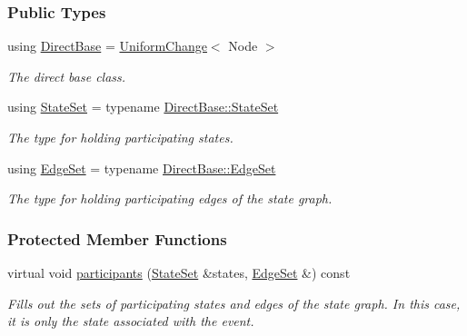 \subsubsection*{Public Types}
\begin{DoxyCompactItemize}
\item 
using \hyperlink{structevent_1_1VertexChange_aa6545b42a28177a72cfb6010582a9e55}{Direct\+Base} = \hyperlink{structevent_1_1UniformChange}{Uniform\+Change}$<$ Node $>$\hypertarget{structevent_1_1VertexChange_aa6545b42a28177a72cfb6010582a9e55}{}\label{structevent_1_1VertexChange_aa6545b42a28177a72cfb6010582a9e55}

\begin{DoxyCompactList}\small\item\em The direct base class. \end{DoxyCompactList}\item 
using \hyperlink{structevent_1_1VertexChange_abc767a10b12e5126c7be6c1ffa4ebc6c}{State\+Set} = typename \hyperlink{structevent_1_1UniformChange_a71997f4cc920d6c5c65fab2049d5e42d}{Direct\+Base\+::\+State\+Set}\hypertarget{structevent_1_1VertexChange_abc767a10b12e5126c7be6c1ffa4ebc6c}{}\label{structevent_1_1VertexChange_abc767a10b12e5126c7be6c1ffa4ebc6c}

\begin{DoxyCompactList}\small\item\em The type for holding participating states. \end{DoxyCompactList}\item 
using \hyperlink{structevent_1_1VertexChange_a85d3d16cf43461137d3d646e99f31be2}{Edge\+Set} = typename \hyperlink{structevent_1_1UniformChange_a01841b7c7ff05760a96c8b239f82a29c}{Direct\+Base\+::\+Edge\+Set}\hypertarget{structevent_1_1VertexChange_a85d3d16cf43461137d3d646e99f31be2}{}\label{structevent_1_1VertexChange_a85d3d16cf43461137d3d646e99f31be2}

\begin{DoxyCompactList}\small\item\em The type for holding participating edges of the state graph. \end{DoxyCompactList}\end{DoxyCompactItemize}
\subsubsection*{Protected Member Functions}
\begin{DoxyCompactItemize}
\item 
virtual void \hyperlink{structevent_1_1VertexChange_a4f776ec8459db3bff84a28c3ce995203}{participants} (\hyperlink{structevent_1_1UniformChange_a71997f4cc920d6c5c65fab2049d5e42d}{State\+Set} \&states, \hyperlink{structevent_1_1UniformChange_a01841b7c7ff05760a96c8b239f82a29c}{Edge\+Set} \&) const 
\begin{DoxyCompactList}\small\item\em Fills out the sets of participating states and edges of the state graph. In this case, it is only the state associated with the event. \end{DoxyCompactList}\end{DoxyCompactItemize}
